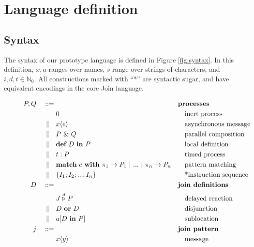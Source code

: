 \section{Language definition}

\subsection{Syntax}

The syntax of our prototype language is defined in Figure \ref{fig:syntax}. In
this definition, $x,a$ ranges over names, $s$ range over strings of characters,
and $i,d,t \in \mathbb{N}_0$. All constructions marked with ``*'' are syntactic
sugar, and have equivalent encodings in the core Join language.

\begin{figure}
\begin{align*}
P,Q\quad::={}&             && \textbf{processes} \\
          & 0              && \quad\textrm{inert process} \\
 \alt\quad& x\langle e \rangle
                           && \quad\textrm{asynchronous message} \\
 \alt\quad& P~\&~Q         && \quad\textrm{parallel composition} \\
 \alt\quad& \textbf{def}~D~\textbf{in}~P
                           && \quad\textrm{local definition} \\
 \alt\quad& t : P          && \quad\textrm{timed process} \\
 \alt\quad& \textbf{match}~e~\textbf{with}~\pi_1
               \rightarrow P_1 ~|~ ... ~|~ \pi_n \rightarrow P_n
                           && \quad\textrm{pattern matching} \\
 \alt\quad& \{ I_1; I_2; ...; I_n \}
                           && \quad\textrm{*instruction sequence} \\
D\quad ::={}&              && \textbf{join definitions} \\
         & J \stackrel{d}{\triangleright} P
                           && \quad\textrm{delayed reaction} \\
\alt\quad& D~\textbf{or}~D && \quad\textrm{disjunction} \\
\alt\quad& a[D~\textbf{in}~P] && \quad\textrm{sublocation} \\
j\quad ::={}&             && \textbf{join pattern} \\
            & x\langle y \rangle
                           && \quad\textrm{message} \\

\end{align*}
\end{figure}
